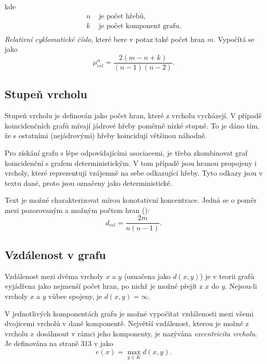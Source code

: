 \documentclass[dp.tex]{subfiles}
\begin{document}
kde
\begin{align*}
	n & \text{ je počet hřebů,}\\
	k & \text{ je počet komponent grafu.}\\
\end{align*}  
\textit{Relativní cyklomatické číslo}, které bere v potaz také počet hran $m$. Vypočítá se jako
\begin{equation}
\mu_\textit{rel}^\alpha=\frac{2(m-n+k)}{(n-1)(n-2)}.
\end{equation}

\subsection{Stupeň vrcholu}
Stupeň vrcholu je definován jako počet hran, které z vrcholu vycházejí. V případě koincidenčních grafů mívají jádrové hřeby poměrně nízké stupně. To je dáno tím, že s ostatními (nejádrovými) hřeby koincidují většinou náhodně.

Pro získání grafu s lépe odpovídajícími asociacemi, je třeba zkombinovat graf koincidenční s grafem deterministickým. V tom případě jsou hranou propojeny i vrcholy, které reprezentují vzájemně na sebe odkazující hřeby. Tyto odkazy jsou v textu dané, proto jsou označeny jako deterministické.

Text je možné charakterizovat mírou konotativní koncentrace. Jedná se o poměr mezi pozorovaným a možným počtem hran (\cite[str. 312]{Wimmer2003}):
\begin{equation}
d_\textit{rel}=\frac{2m}{n(n-1)}.
\end{equation}

\subsection{Vzdálenost v grafu}
Vzdálenost mezi dvěma vrcholy $x$ a $y$ (označena jako $d(x,y)$) je v teorii grafů vyjádřena jako nejmenší počet hran, po nichž je možné přejít z $x$ do $y$. Nejsou-li vrcholy $x$ a $y$ vůbec spojeny, je $d(x,y)=\infty$.

V jednotlivých komponentách grafu je možné vypočítat vzdálenosti mezi všemi dvojicemi vrcholů v dané komponentě. Největší vzdálenost, kterou je možné z  vrcholu $x$ dosáhnout v rámci jeho komponenty, je nazývána \textit{excentricita vrcholu}. Je definována na straně 313 v \cite{Wimmer2003} jako
\begin{equation}
e(x)=\max_{y \in K} d(x,y).
\end{equation}
\end{document}

